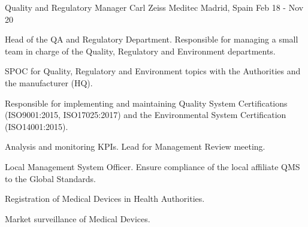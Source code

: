 \begin{cventries}
\cventry
    {Quality and Regulatory Manager} %
    {Carl Zeiss Meditec} %
    {Madrid, Spain} %
    {Feb 18 - Nov 20} %
    {
        \begin{cvitems} %
            \item {Head of the QA and Regulatory Department. Responsible for managing a small team in charge of the Quality, Regulatory and Environment departments.}
            \item {SPOC for Quality, Regulatory and Environment topics with the Authorities and the manufacturer (HQ).}
            \item {Responsible for implementing and maintaining Quality System Certifications (ISO9001:2015, ISO17025:2017) and the Environmental System Certification (ISO14001:2015).}
            \item {Analysis and monitoring KPIs. Lead for Management Review meeting.}
            \item {Local Management System Officer. Ensure compliance of the local affiliate QMS to the Global Standards.}
            \item {Registration of Medical Devices in Health Authorities.}
            \item {Market surveillance of Medical Devices.}
        \end{cvitems}
    }


\end{cventries}
